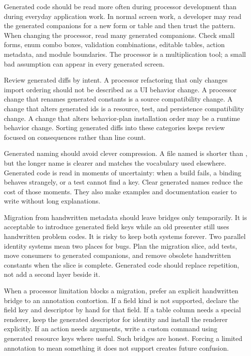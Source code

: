 Generated code should be read more often during processor development than
during everyday application work. In normal screen work, a developer may read
the generated companions for a new form or table and then trust the pattern.
When changing the processor, read many generated companions. Check small
forms, enum combo boxes, validation combinations, editable tables, action
metadata, and module boundaries. The processor is a multiplication tool; a
small bad assumption can appear in every generated screen.

Review generated diffs by intent. A processor refactoring that only changes
import ordering should not be described as a UI behavior change. A processor
change that renames generated constants is a source compatibility change. A
change that alters generated ids is a resource, test, and persistence
compatibility change. A change that alters behavior-plan installation order
may be a runtime behavior change. Sorting generated diffs into these
categories keeps review focused on consequences rather than line count.

Generated naming should avoid clever compression. A file named
 is shorter than , but the
longer name is clearer and matches the vocabulary used elsewhere. Generated
code is read in moments of uncertainty: when a build fails, a binding behaves
strangely, or a test cannot find a key. Clear generated names reduce the cost
of those moments. They also make examples and documentation easier to write
without long explanations.

Migration from handwritten metadata should leave bridges only temporarily. It
is acceptable to introduce generated field keys while an old presenter still
uses handwritten problem codes. It is risky to keep both systems forever. Two
parallel identity systems mean two places for bugs. Plan the migration slice,
add tests, move consumers to generated companions, and remove obsolete
handwritten constants when the slice is complete. Generated code should
replace repetition, not add a second layer beside it.

When a processor limitation blocks a migration, prefer an explicit handwritten
bridge to an annotation contortion. If a field kind is not supported, declare
the field key and descriptor by hand for that field. If a table column needs a
special renderer, keep the generated descriptor for identity and install the
renderer explicitly. If an action needs arguments, write a custom command
using generated resource keys where useful. Such bridges are honest. Forcing a
limited annotation to mean something it does not support creates future
confusion.

